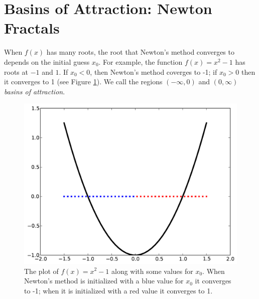 \section*{Basins of Attraction: Newton Fractals}
When $f(x)$ has many roots, the root that Newton's method converges to depends on the initial guess $x_0$.
For example, the function $f(x)=x^2-1$ has roots at $-1$ and $1$.
If $x_0<0$, then Newton's method coverges to -1; if $x_0>0$ then it converges to 1 (see Figure \ref{fig:basins1}).
We call the regions $(-\infty, 0)$ and $(0, \infty)$ \emph{basins of attraction}.

\begin{figure}
\begin{center}
\includegraphics[scale=0.5]{basins1}
\caption{The plot of $f(x) = x^2 -1$ along with some values for $x_0$.
When Newton's method is initialized with a blue value for $x_0$ it converges to -1; when it is initialized with a red value it converges to 1.}
\label{fig:basins1}
\end{center}
\end{figure}

